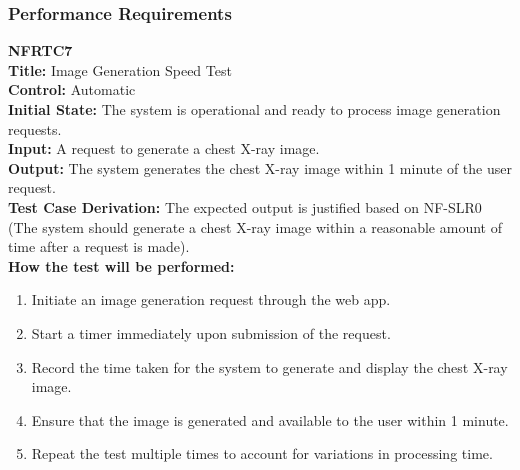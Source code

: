 \documentclass[12pt, titlepage]{article}
\begin{document}
\subsubsection{Performance Requirements}
\textbf{NFRTC7}\\
\textbf{Title:} Image Generation Speed Test\\
\textbf{Control:} Automatic\\
\textbf{Initial State:} The system is operational and ready to process image generation requests.\\
\textbf{Input:} A request to generate a chest X-ray image.\\
\textbf{Output:} The system generates the chest X-ray image within 1 minute of the user request.\\
\textbf{Test Case Derivation:} The expected output is justified based on NF-SLR0 (The system should generate a chest X-ray image within a reasonable amount of time after a request is made).\\
\textbf{How the test will be performed:}
\begin{enumerate}
  \item Initiate an image generation request through the web app.
  \item Start a timer immediately upon submission of the request.
  \item Record the time taken for the system to generate and display the chest X-ray image.
  \item Ensure that the image is generated and available to the user within 1 minute.
  \item Repeat the test multiple times to account for variations in processing time.
\end{enumerate}
\vspace{1em}
\end{document}
